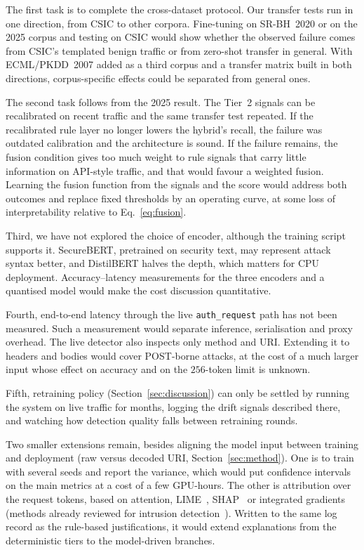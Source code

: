 \documentclass[preprint,11pt]{elsarticle}
\begin{document}
The first task is to complete the cross-dataset protocol. Our transfer
tests run in one direction, from CSIC to other corpora. Fine-tuning on
SR-BH~2020 or on the 2025 corpus and testing on CSIC would show whether the
observed failure comes from CSIC's templated benign traffic or from
zero-shot transfer in general. With ECML/PKDD~2007 added as a third corpus
and a transfer matrix built in both directions, corpus-specific effects
could be separated from general ones.

The second task follows from the 2025 result. The Tier~2 signals can be
recalibrated on recent traffic and the same transfer test repeated. If the
recalibrated rule layer no longer lowers the hybrid's recall, the failure
was outdated calibration and the architecture is sound. If the failure
remains, the fusion condition gives too much weight to rule signals that
carry little information on API-style traffic, and that would favour a
weighted fusion. Learning the fusion function from the signals and the
score would address both outcomes and replace fixed thresholds by an
operating curve, at some loss of interpretability relative to
Eq.~\eqref{eq:fusion}.

Third, we have not explored the choice of encoder, although the training
script supports it. SecureBERT, pretrained on security text, may represent
attack syntax better, and DistilBERT halves the depth, which matters for
CPU deployment. Accuracy--latency measurements for the three encoders and a
quantised model would make the cost discussion quantitative.

Fourth, end-to-end latency through the live \texttt{auth\_request} path has
not been measured. Such a measurement would separate inference,
serialisation and proxy overhead. The live detector also inspects only
method and URI. Extending it to headers and bodies would cover POST-borne
attacks, at the cost of a much larger input whose effect on accuracy and on
the $256$-token limit is unknown.

Fifth, retraining policy (Section~\ref{sec:discussion}) can only be settled
by running the system on live traffic for months, logging the drift signals
described there, and watching how detection quality falls between
retraining rounds.

Two smaller extensions remain, besides aligning the model input between
training and deployment (raw versus decoded URI, Section~\ref{sec:method}).
One is to train with several seeds and report the variance, which would put
confidence intervals on the main metrics at a cost of a few GPU-hours. The
other is attribution over the request tokens, based on attention,
LIME~\cite{ribeiro2016lime}, SHAP~\cite{lundberg2017shap} or integrated
gradients~\cite{sundararajan2017axiomatic} (methods already reviewed for
intrusion detection~\cite{xai_ids_2025}). Written to the same log record as
the rule-based justifications, it would extend explanations from the
deterministic tiers to the model-driven branches.
\end{document}
